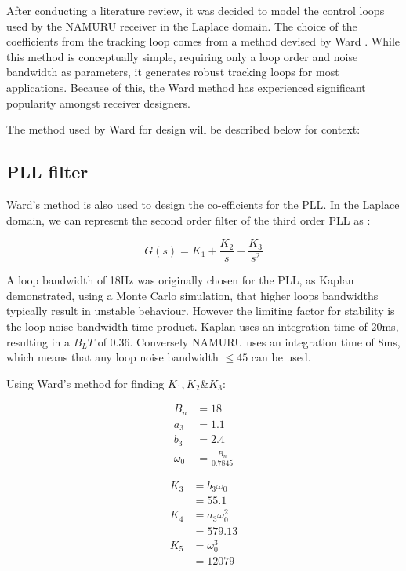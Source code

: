 

After conducting a literature review, it was decided to model the control loops used by the \ac{NAMURU} receiver in the Laplace domain. The choice of the coefficients from the tracking loop comes from a method devised by Ward \cite{Ward}. While this method is conceptually simple, requiring only a loop order and noise bandwidth as parameters, it generates robust tracking loops for most applications. Because of this, the Ward method has experienced significant popularity amongst receiver designers.  

The method used by Ward for design will be described below for context: 


\subsection{\ac{PLL} filter}
Ward's method is also used to design the co-efficients for the \ac{PLL}. In the Laplace domain, we can represent the second order filter  of the third order \ac{PLL} as : 

\begin{equation} \label{eq6}
G(s) = K_1 + \frac{K_2}{s} + \frac{K_3}{s^2}
\end{equation}

A loop bandwidth of 18Hz was originally chosen for the \ac{PLL}, as Kaplan\cite{Kaplan} demonstrated, using a Monte Carlo simulation, that higher loops bandwidths typically result in unstable behaviour. However the limiting factor for stability is the loop noise bandwidth time product. Kaplan uses an integration time of 20ms, resulting in a $B_LT$ of 0.36. Conversely \ac{NAMURU} uses an integration time of 8ms, which means that any loop noise bandwidth $\leq 45$ can be used. 

Using Ward's method\cite{Ward} for finding $K_1,K_2 \& K_3$:

\begin{align*}
B_n &= 18\\
a_3&=1.1\\
b_3&=2.4\\
\omega_{0}&=\frac{B_n}{0.7845}
\end{align*}

\begin{align*} \label{eq3}
K_3 & = b_3 \omega_{0}\\
    & = 55.1\\
K_4 & = a_3 \omega_{0}^2\\ 
    & = 579.13\\
K_5 & = \omega_{0}^3\\
    & = 12079
\end{align*}


